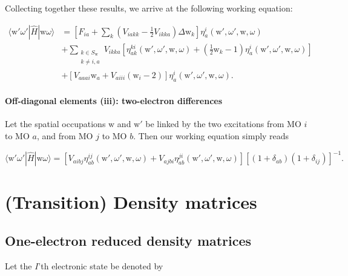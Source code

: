 \documentclass[12pt,a4paper]{report}
\begin{document}
Collecting together these results, we arrive at the following working
equation:

\begin{equation}\label{eq:hij_single_working}
  \begin{aligned}
   \langle \text{w}' \omega' | \hat{H} | \text{w} \omega \rangle &=
   \left[ F_{ia} + \sum_{k} \left( V_{iakk} - \frac{1}{2} V_{ikka}
     \right) \Delta \text{w}_{k} \right]
   \eta_{a}^{i}(\text{w}',\omega',\text{w},\omega) \\
   &+ \sum_{\substack{k \in S_{\text{w}} \\ k \ne i,a}} V_{ikka}
   \left[ \eta_{ak}^{ki}(\text{w}',\omega',\text{w},\omega) + \left(
     \frac{1}{2}\text{w}_{k} -1 \right)
     \eta_{a}^{i}(\text{w}',\omega',\text{w},\omega) \right] \\
   &+ \left[ V_{aaai} \text{w}_{a} + V_{aiii} \left( \text{w}_{i} -2
     \right) \right] \eta_{a}^{i}(\text{w}',\omega',\text{w},\omega).
  \end{aligned}
\end{equation}

\subsubsection{Off-diagonal elements (iii): two-electron differences}
Let the spatial occupations $\text{w}$ and $\text{w}'$ be linked by
the two excitations from MO $i$ to MO $a$, and from MO $j$ to MO
$b$. Then our working equation simply reads

\begin{equation}\label{eq:hij_double_working}
  \langle \text{w}' \omega' | \hat{H} | \text{w} \omega \rangle =
  \left[ V_{aibj} \eta_{ab}^{ij}(\text{w}',\omega',\text{w},\omega) +
    V_{ajbi} \eta_{ab}^{ji}(\text{w}',\omega',\text{w},\omega) \right]
  \left[ (1+\delta_{ab}) (1+\delta_{ij}) \right]^{-1}.
\end{equation}

\chapter{(Transition) Density matrices}
\section{One-electron reduced density matrices}
Let the $I$'th electronic state be denoted by
\end{document}
